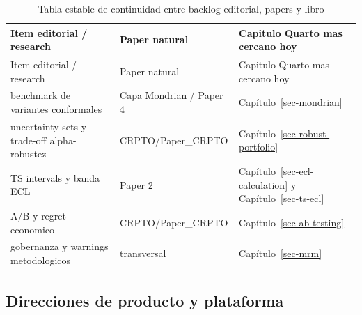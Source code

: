 \documentclass[
  spanish,
  11pt,
  letterpaper,
]{scrbook}
\theoremstyle{plain}
\theoremstyle{remark}
\begin{document}
\begin{longtable}[]{@{}
  >{\raggedright\arraybackslash}p{}
  >{\raggedright\arraybackslash}p{}
  >{\raggedright\arraybackslash}p{}@{}}
\caption{Tabla estable de continuidad entre backlog editorial, papers y
libro}\label{tbl-paper-chapter-bridge}\tabularnewline
\toprule\noalign{}
\begin{minipage}[b]{\linewidth}\raggedright
Item editorial / research
\end{minipage} & \begin{minipage}[b]{\linewidth}\raggedright
Paper natural
\end{minipage} & \begin{minipage}[b]{\linewidth}\raggedright
Capitulo Quarto mas cercano hoy
\end{minipage} \\
\midrule\noalign{}
\endfirsthead
\toprule\noalign{}
\begin{minipage}[b]{\linewidth}\raggedright
Item editorial / research
\end{minipage} & \begin{minipage}[b]{\linewidth}\raggedright
Paper natural
\end{minipage} & \begin{minipage}[b]{\linewidth}\raggedright
Capitulo Quarto mas cercano hoy
\end{minipage} \\
\midrule\noalign{}
\endhead
\bottomrule\noalign{}
\endlastfoot
benchmark de variantes conformales & Capa Mondrian / Paper 4 &
Capítulo~\ref{sec-mondrian} \\
uncertainty sets y trade-off alpha-robustez & CRPTO/Paper\_CRPTO &
Capítulo~\ref{sec-robust-portfolio} \\
TS intervals y banda ECL & Paper 2 & Capítulo~\ref{sec-ecl-calculation}
y Capítulo~\ref{sec-ts-ecl} \\
A/B y regret economico & CRPTO/Paper\_CRPTO &
Capítulo~\ref{sec-ab-testing} \\
gobernanza y warnings metodologicos & transversal &
Capítulo~\ref{sec-mrm} \\
\end{longtable}

\subsection{Direcciones de producto y
plataforma}\label{direcciones-de-producto-y-plataforma}
\end{document}
